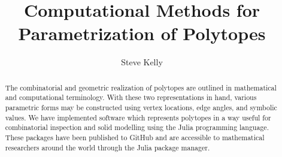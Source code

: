 \documentclass[a4paper]{report}
\title{Computational Methods for Parametrization of Polytopes}
\author{Steve Kelly}
\begin{document}
\maketitle

\tableofcontents
\clearpage 


\begin{abstract}
The combinatorial and geometric realization of polytopes are outlined in
mathematical and computational terminology. With these two representations in
hand, various parametric forms may be constructed using vertex locations, edge
angles, and symbolic values. We have implemented
software which represents polytopes in a way useful for combinatorial
inspection and solid modelling using the Julia programming language.
These packages have been published to GitHub and are accessible to
mathematical researchers around the world through the Julia package manager.
\end{abstract}
















\end{document}
